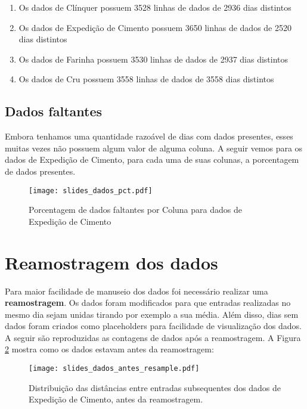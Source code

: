 \begin{enumerate}
    \item Os dados de  Clínquer possuem 3528 linhas de dados de 2936 dias distintos
\item Os dados de  Expedição de Cimento possuem 3650 linhas de dados de 2520 dias distintos
\item Os dados de  Farinha possuem 3530 linhas de dados de 2937 dias distintos
\item Os dados de  Cru possuem 3558 linhas de dados de 3558 dias distintos
\end{enumerate}

\subsection{Dados faltantes}
Embora tenhamos uma quantidade razoável de dias com dados presentes, esses muitas vezes não possuem algum valor de alguma coluna.
A seguir vemos para os dados de Expedição de Cimento, para cada uma de suas colunas, a porcentagem de dados presentes. 


\begin{figure}[H]
  \centering
  \texttt{[image: slides\_dados\_pct.pdf]}
  \caption{Porcentagem de dados faltantes por Coluna para dados de Expedição de Cimento}
  \label{fig:dadosfalta}
\end{figure}


\section{Reamostragem dos dados}
Para maior facilidade de manuseio dos dados foi necessário realizar uma
\textbf{reamostragem}. Os dados foram modificados para que entradas realizadas no
mesmo dia sejam unidas tirando por exemplo a sua média. Além disso, dias sem
dados foram criados como placeholders para facilidade de visualização dos dados.
A seguir são reproduzidas as contagens de dados após a reamostragem.
A Figura \ref{fig:reamos} mostra como os dados estavam antes da reamostragem: 

\begin{figure}[H]
  \centering
  \texttt{[image: slides\_dados\_antes\_resample.pdf]}
  \caption{Distribuição das distâncias entre entradas subsequentes dos dados de Expedição de Cimento, antes da reamostragem.}
  \label{fig:reamos}
\end{figure}

